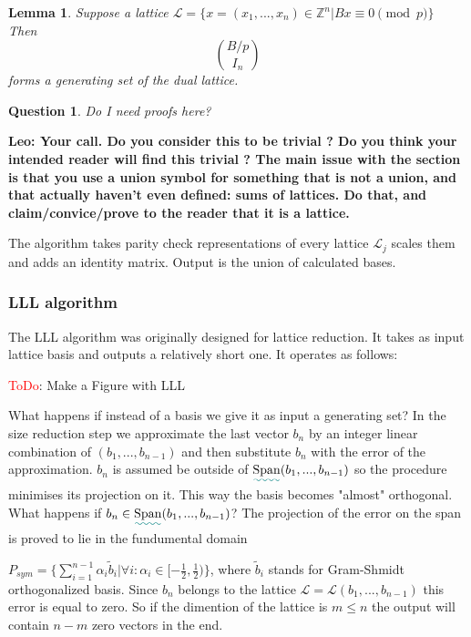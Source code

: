 \documentclass[12pt]{article}
\newcommand{\ZZ}{\mathbb{Z}}
\newcommand{\LL}{\mathcal{L}}
\DeclareMathOperator{\Span}{Span}
\newtheorem{question}{Question}
\newtheorem{lemma}{Lemma}
\def\added{\bgroup \markoverwith{\textcolor{green!50!blue}{\lower4.5pt\hbox{\sixly \char58}}}\ULon}
\begin{document}
\begin{lemma}
    Suppose a lattice $\LL = \{x = (x_{1}, ..., x_{n}) \in \ZZ^{n} | Bx \equiv 0 \pmod{p}\}$
    Then
    \[
    \binom{B/p}{I_{n}}
    \]
    forms a generating set of the dual lattice.
\end{lemma}

\begin{question}
    Do I need proofs here?
\end{question}
{\bf Leo: Your call. Do you consider this to be trivial ? Do you think your intended reader will find this trivial ? The main issue with the section is that you use a union symbol for something that is not a union, and that actually haven't even defined: sums of lattices. Do that, and claim/convice/prove to the reader that it is a lattice.}



The algorithm takes parity check representations of every lattice $\LL_{j}$ scales them and adds an identity matrix. Output is the union of calculated bases.

\subsubsection{LLL algorithm}
The LLL algorithm was originally designed for lattice reduction. It takes as input lattice basis and outputs a relatively short one. It operates as follows:

\textcolor{red}{ToDo}: Make a Figure with LLL

What happens if instead of a basis we give it as input a generating set?
In the size reduction step we approximate the last vector $b_{n}$ by an integer linear combination of $(b_{1}, ..., b_{n-1})$ and then substitute $b_{n}$ with the error of the approximation. $b_{n}$ is assumed be outside of $\added{\Span}(b_{1}, ..., b_{n-1})$ so the procedure minimises its projection on it. This way the basis becomes "almost" orthogonal. What happens if $b_{n} \in \added{\Span}(b_{1}, ..., b_{n-1})$? The projection of the error on the span is proved to lie in the fundumental domain

$P_{sym} = \{ \sum_{i = 1}^{n-1}\alpha_{i}\tilde{b}_{i}| \forall i: \alpha_{i} \in [-\frac{1}{2}, \frac{1}{2})\}$, where $\tilde{b}_{i}$ stands for Gram-Shmidt orthogonalized basis. Since $b_{n}$ belongs to the lattice $\LL = \LL(b_{1}, ..., b_{n-1})$
this error is equal to zero. So if the dimention of the lattice is $m \leq n$ the output will contain $n-m$ zero vectors in the end.
\end{document}
